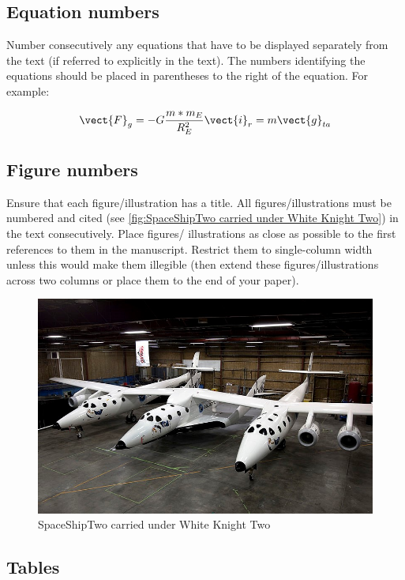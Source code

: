 \documentclass{iac}
\begin{document}
\subsection{Equation numbers}

Number consecutively any equations that have to be displayed separately from the text (if referred to explicitly in the text). The numbers identifying the equations should be placed in parentheses to the right of the equation. For example:

\begin{equation}
    \vect{F}_g = -G\frac{m*m_E}{R_E^2}\vect{i}_r = m\vect{g}_{ta}
\end{equation}

\subsection{Figure numbers}

Ensure that each figure/illustration has a title. All figures/illustrations must be numbered and cited (see \autoref{fig:SpaceShipTwo carried under White Knight Two}) in the text consecutively. Place figures/ illustrations as close as possible to the first references to them in the manuscript. Restrict them to single-column width unless this would make them illegible (then extend these figures/illustrations across two columns or place them to the end of your paper). 

\begin{figure}[H]
    \centering
    \includegraphics[width=0.8\linewidth]{figures/SpaceShipTwo.jpg}
    \caption{SpaceShipTwo carried under White Knight Two}
    \label{fig:SpaceShipTwo carried under White Knight Two}
\end{figure}

\subsection{Tables}
\end{document}
